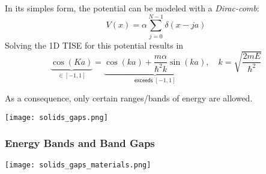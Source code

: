 
In its simples form, the potential can be modeled with a \textit{Dirac-comb}:
\noindent\begin{equation*}
    V(x)=\alpha\sum_{j=0}^{N-1}\delta(x-ja)
\end{equation*}
Solving the 1D TISE for this potential results in
\noindent\begin{equation*}
    \underbrace{\cos(Ka)}_{\in [-1,1]} = \underbrace{\cos(ka) + \frac{m\alpha}{\hbar^2 k}\sin(ka)}_{\textsf{exceeds }[-1,1]}, \quad k=\sqrt{\frac{2mE}{\hbar^2}}
\end{equation*}

As a consequence, only certain ranges/bands of energy are allowed.
\begin{center}
    \texttt{[image: solids\_gaps.png]}
\end{center}

\subsubsection{Energy Bands and Band Gaps}

\begin{center}
    \texttt{[image: solids\_gaps\_materials.png]}
\end{center}